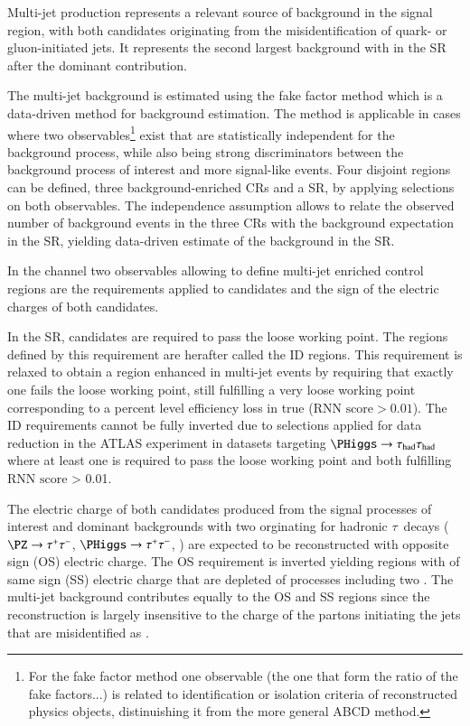 \label{sec:hadhad_multijet}

Multi-jet production represents a relevant source of background in the
\hadhad signal region, with both \tauhadvis candidates originating
from the misidentification of quark- or gluon-initiated jets. It
represents the second largest background with \faketauhadvis in the
\hadhad SR after the dominant \ttbarFakes contribution.

The multi-jet background is estimated using the fake factor method
which is a data-driven method for background estimation. The method is
applicable in cases where two observables\footnote{For the fake factor
  method one observable (the one that form the ratio of the fake
  factors...) is related to identification or isolation criteria of
  reconstructed physics objects, distinuishing it from the more
  general ABCD method.} exist that are statistically independent for
the background process, while also being strong discriminators between
the background process of interest and more signal-like events. Four
disjoint regions can be defined, three background-enriched CRs and a
SR, by applying selections on both observables. The independence
assumption allows to relate the observed number of background events
in the three CRs with the background expectation in the SR, yielding
data-driven estimate of the background in the SR.

In the \hadhad channel two observables allowing to define multi-jet
enriched control regions are the \tauid requirements applied to
\tauhadvis candidates and the sign of the electric charges of both
candidates.

In the \hadhad SR, \tauhadvis candidates are required to pass the
loose \tauid working point. The regions defined by this requirement
are herafter called the ID regions. This \tauid requirement is relaxed
to obtain a region enhanced in multi-jet events by requiring that
exactly one \tauhadvis fails the loose \tauid working point, still
fulfilling a very loose working point corresponding to a percent level
efficiency loss in true \tauhad ($\text{RNN score} > 0.01$). The ID
requirements cannot be fully inverted due to selections applied for
data reduction in the ATLAS experiment in datasets targeting
$\PHiggs \to \hadhad$ where at least one \tauhadvis is required to
pass the loose working point and both \tauhadvis fulfilling
$\text{RNN score}$ > 0.01.

The electric charge of both \tauhadvis candidates produced from the
signal processes of interest and dominant backgrounds with two
\tauhadvis orginating for hadronic $\tau$~decays ($\PZ \to \tautau$,
$\PHiggs \to \tautau$, \ttbar) are expected to be reconstructed with
opposite sign (OS) electric charge. The OS requirement is inverted
yielding regions with \tauhadvis of same sign (SS) electric charge
that are depleted of processes including two \tauhad. The multi-jet
background contributes equally to the OS and SS regions since the
\tauhadvis reconstruction is largely insensitive to the charge of the
partons initiating the jets that are misidentified as \tauhadvis.

